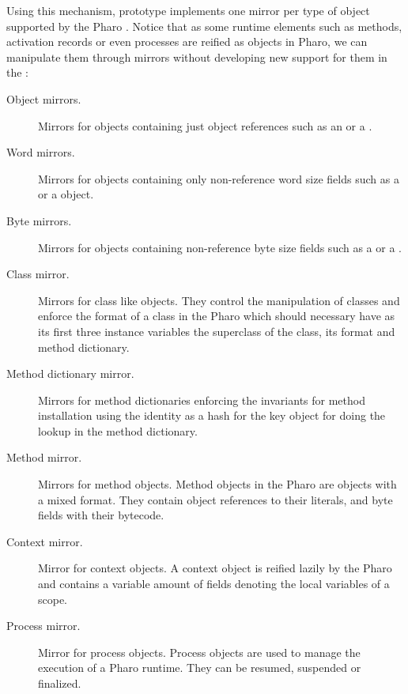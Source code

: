 Using this mechanism, \Vtt prototype implements one mirror per type of object supported by the Pharo \VM. Notice that as some runtime elements such as methods, activation records or even processes are reified as objects in Pharo, we can manipulate them through mirrors without developing new support for them in the \VM:

\begin{description}
\item[Object mirrors.] Mirrors for objects containing just object references such as an  or a .
\item[Word mirrors.] Mirrors for objects containing only non-reference word size fields such as a  or a  object.
\item[Byte mirrors.] Mirrors for objects containing non-reference byte size fields such as a  or a . 
\item[Class mirror.] Mirrors for class like objects. They control the manipulation of classes and enforce the format of a class in the Pharo \VM which should necessary have as its first three instance variables the superclass of the class, its format and method dictionary.
\item[Method dictionary mirror.] Mirrors for method dictionaries enforcing the \VM invariants for method installation \ie using the identity as a hash for the key object for doing the lookup in the method dictionary.
\item[Method mirror.] Mirrors for method objects. Method objects in the Pharo \VM are objects with a mixed format. They contain object references to their literals, and byte fields with their bytecode.
\item[Context mirror.] Mirror for context objects. A context object is reified lazily by the Pharo \VM and contains a variable amount of fields denoting the local variables of a scope.
\item[Process mirror.] Mirror for process objects. Process objects are used to manage the execution of a Pharo runtime. They can be resumed, suspended or finalized.
\end{description}



